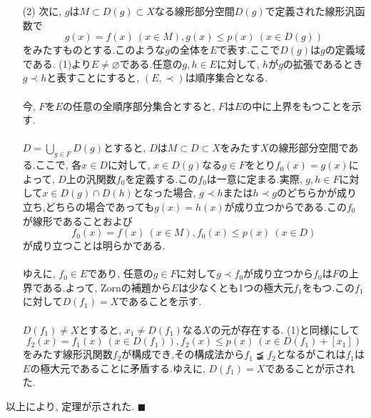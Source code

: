 \documentclass[a4j,dvipdfmx]{jarticle}
\renewcommand{\d}{\displaystyle}
\begin{document}
\begin{description}
\begin{enumerate}
\item[(2)] 次に, $g$は$M\subset D(g) \subset X$なる線形部分空間$D(g)$で定義された線形汎函数で
\[ g(x)=f(x) \ (x\in M), g(x)\leq p(x) \ (x\in D(g)) \]
をみたすものとする.このような$g$の全体を$E$で表す.ここで$D(g)$は$g$の定義域である. (1)より$E\neq\varnothing$である.任意の$g,h\in E$に対して, $h$が$g$の拡張であるとき$g\prec h$と表すことにすると, $(E,\prec)$は順序集合となる. \\ \ \\
今, $F$を$E$の任意の全順序部分集合とすると, $F$は$E$の中に上界をもつことを示す. \\ \ \\
$D=\d\bigcup_{g\in F}D(g)$とすると, $D$は$M\subset D\subset X$をみたす$X$の線形部分空間である.ここで, 各$x\in D$に対して, $x\in D(g)$なる$g\in F$をとり$f_0(x)=g(x)$によって, $D$上の汎関数$f_0$を定義する.この$f_0$は一意に定まる.実際, $g,h\in F$に対して$x\in D(g)\cap D(h)$となった場合, $g\prec h$または$h\prec g$のどちらかが成り立ち,どちらの場合であっても$g(x)=h(x)$が成り立つからである.この$f_0$が線形であることおよび
\[ f_0(x)=f(x) \ (x\in M), f_0(x)\leq p(x) \ (x\in D) \]
が成り立つことは明らかである. \\ \ \\
ゆえに, $f_0\in E$であり, 任意の$g\in F$に対して$g\prec f_0$が成り立つから$f_0$は$F$の上界である.よって, Zornの補題から$E$は少なくとも1つの極大元$f_1$をもつ.この$f_1$に対して$D(f_1)=X$であることを示す. \\ \ \\
$D(f_1)\neq X$とすると, $x_1\neq D(f_1)$なる$X$の元が存在する. (1)と同様にして
\[ f_2(x)=f_1(x) \ (x\in D(f_1)), f_2(x)\leq p(x) \ (x\in D(f_1)+[x_1]) \]
をみたす線形汎関数$f_2$が構成でき,その構成法から$f_1 \precneqq f_2$となるがこれは$f_1$は$E$の極大元であることに矛盾する.ゆえに, $D(f_1)=X$であることが示された.
\end{enumerate}
以上により, 定理が示された. $\blacksquare$
\end{description}
\end{document}
